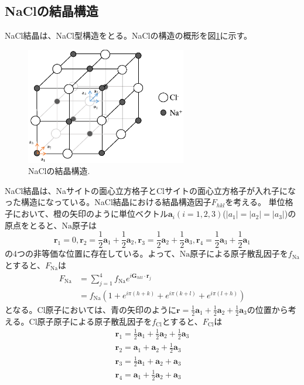\documentclass[11pt,a4j,uplatex]{jsarticle}
\begin{document}
\newpage
\subsection{NaClの結晶構造}
NaCl結晶は、NaCl型構造をとる。NaClの構造の概形を図\ref{nacl}に示す。

\begin{figure}[htb]
 \centering
 \includegraphics[clip,width=7cm]{nacl.eps}
 \caption{NaClの結晶構造.}
 \label{nacl}
\end{figure}

NaCl結晶は、Naサイトの面心立方格子とClサイトの面心立方格子が入れ子になった構造になっている。NaCl結晶における結晶構造因子$F_{hkl}$を考える。
単位格子において、橙の矢印のように単位ベクトル$\bm{a}_i(i=1,2,3)$($|a_1|=|a_2|=|a_3|$)の原点をとると、$\mathrm{Na}$原子は
\begin{equation}
  \bm{r}_1=0,\bm{r}_2=\frac{1}{2}\bm{a}_1+\frac{1}{2}\bm{a}_2,\bm{r}_3=\frac{1}{2}\bm{a}_2+\frac{1}{2}\bm{a}_3,\bm{r}_4=\frac{1}{2}\bm{a}_3+\frac{1}{2}\bm{a}_1
\end{equation}
の4つの非等価な位置に存在している。よって、$\mathrm{Na}$原子による原子散乱因子を$f_{\mathrm{Na}}$とすると、$F_{\mathrm{Na}}$は
\begin{equation}
  \begin{split}
  F_{\mathrm{Na}}&=\sum_{j=1}^4f_{\mathrm{Na}}e^{i\bm{G}_{hkl}\cdot\bm{r}_j}\\
  &=f_{\mathrm{Na}}(1+e^{i\pi(h+k)}+e^{i\pi(k+l)}+e^{i\pi(l+h)})
\end{split}
\end{equation}
となる。$\mathrm{Cl}$原子においては、青の矢印のように$\bm{r}=\frac{1}{2}\bm{a}_1+\frac{1}{2}\bm{a}_2+\frac{1}{2}\bm{a}_3$の位置から考える。Cl原子原子による原子散乱因子を$f_{\mathrm{Cl}}$とすると、$F_{\mathrm{Cl}}$は
\begin{equation}
  \begin{split}
  \bm{r}_1=\frac{1}{2}\bm{a}_1+\frac{1}{2}\bm{a}_2+\frac{1}{2}\bm{a}_3\\
  \bm{r}_2=\bm{a}_1+\bm{a}_2+\frac{1}{2}\bm{a}_3\\
  \bm{r}_3=\frac{1}{2}\bm{a}_1+\bm{a}_2+\bm{a}_3\\
  \bm{r}_4=\bm{a}_1+\frac{1}{2}\bm{a}_2+\bm{a}_3
\end{split}
\end{equation}
\fi
\end{document}
